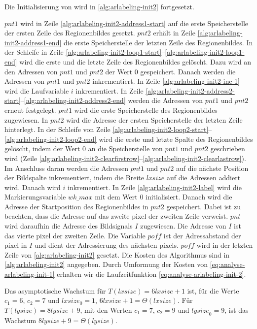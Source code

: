 Die Initialisierung von  wird in \autoref{alg:arlabeling-init2} fortgesetzt.

$\mathit{pnt1}$ wird in Zeile \ref{alg:arlabeling-init2-address1-start} auf die erste Speicherstelle der ersten Zeile
 des Regionenbildes gesetzt. $\mathit{pnt2}$ erhält in Zeile \ref{alg:arlabeling-init2-address1-end} die erste
 Speicherstelle der letzten Zeile des Regionenbildes.
In der Schleife in Zeile \ref{alg:arlabeling-init2-loop1-start}--\ref{alg:arlabeling-init2-loop1-end} wird die erste
 und die letzte Zeile des Regionenbildes gelöscht. Dazu wird an den Adressen von
 $\mathit{pnt1}$ und $\mathit{pnt2}$ der Wert $0$ gespeichert. Danach werden die Adressen von $\mathit{pnt1}$ und
 $\mathit{pnt2}$ inkrementiert. In Zeile \ref{alg:arlabeling-init2-inc-1} wird die Laufvariable $i$ inkrementiert. In
 Zeile \ref{alg:arlabeling-init2-address2-start}--\ref{alg:arlabeling-init2-address2-end} werden die Adressen
 von $\mathit{pnt1}$ und $\mathit{pnt2}$ erneut festgelegt. $\mathit{pnt1}$ wird die erste Speicherstelle des
 Regionenbildes zugewiesen. In $\mathit{pnt2}$ wird die Adresse der ersten Speicherstelle der letzten Zeile hinterlegt.
 In der Schleife von Zeile \ref{alg:arlabeling-init2-loop2-start}--\ref{alg:arlabeling-init2-loop2-end} wird die erste
 und letzte Spalte des Regionenbildes gelöscht, indem der Wert $0$ an die Speicherstelle von $\mathit{pnt1}$ und
 $\mathit{pnt2}$ geschrieben wird
 (Zeile \ref{alg:arlabeling-init2-clearfirstrow}--\ref{alg:arlabeling-init2-clearlastrow}). Im Anschluss daran werden
 die Adressen $\mathit{pnt1}$ und $\mathit{pnt2}$ auf die nächste Position der Bildspalte inkrementiert, indem die
 Breite $\mathit{lxsize}$ auf die Adressen addiert wird. Danach wird $i$ inkrementiert. In Zeile
 \ref{alg:arlabeling-init2-label} wird die Markierungsvariable $\mathit{wk\_max}$ mit dem Wert $0$ initialisiert.
 Danach wird die Adresse der Startposition des Regionenbildes in $\mathit{pnt2}$ gespeichert. Dabei ist zu beachten,
 dass die Adresse auf das zweite \gls{pixel} der zweiten Zeile verweist. $\mathit{pnt}$ wird daraufhin die Adresse des
 Bildsignals $I$ zugewiesen. Die Adresse von $I$ ist das vierte \gls{pixel} der zweiten Zeile. Die Variable
 $\mathit{poff}$ ist der Adressabstand der \gls{pixel} in $I$ und dient der Adressierung des nächsten \glspl{pixel}.
 $\mathit{poff}$ wird in der letzten Zeile von \autoref{alg:arlabeling-init2} gesetzt. Die Kosten des Algorithmus sind
 in \autoref{alg:arlabeling-init2} angegeben. Durch Umformung der Kosten von \autoref{eq:analyse-arlabeling-init-1}
 erhalten wir die Laufzeitfunktion \autoref{eq:analyse-arlabeling-init-2}.

Das asymptotische Wachstum für $T(\mathit{lxsize}) = 6\mathit{lxsize} + 1$ ist, für die Werte $c_{1} = 6$,
 $c_{2} = 7$ und $\mathit{lxsize}_{0} = 1$, $6\mathit{lxsize} + 1 = \Theta(lxsize)$. Für
 $T(\mathit{lysize}) = 8\mathit{lysize} + 9$, mit den Werten $c_{1} = 7$, $c_{2} = 9$ und $\mathit{lysize}_{0} = 9$,
 ist das Wachstum $8\mathit{lysize} + 9 = \Theta(lysize)$.

